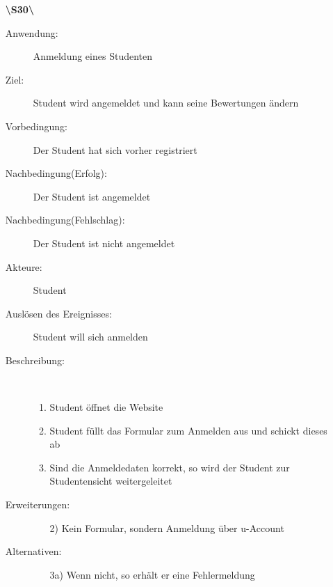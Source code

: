 \documentclass[parskip=full]{scrartcl}
\begin{document}
\begin{enumerate}
  \item[\textbf{\textbackslash S30\textbackslash}] \begin{description}
  \item[Anwendung:] Anmeldung eines Studenten
  \item[Ziel:] Student wird angemeldet und kann seine Bewertungen ändern
  	\item[Vorbedingung:] Der Student hat sich vorher registriert
  	\item[Nachbedingung(Erfolg):] Der Student ist angemeldet
  	\item[Nachbedingung(Fehlschlag):] Der Student ist nicht angemeldet
  	\item[Akteure:] Student
  	\item[Auslösen des Ereignisses:] Student will sich anmelden
  	\item[Beschreibung:]~
  	\begin{enumerate}[1.]
  	  \item Student öffnet die Website
  	  \item Student füllt das Formular zum Anmelden aus und schickt dieses ab
  	  \item Sind die Anmeldedaten korrekt, so wird der Student zur Studentensicht
  	  weitergeleitet
  	\end{enumerate}
  	\item[Erweiterungen:]
  	\begin{enumerate}
  	  \item[2)] Kein Formular, sondern Anmeldung über u-Account
  	\end{enumerate}    	
  	\item[Alternativen:]
	\begin{enumerate}
  	  \item[3a)] Wenn nicht, so erhält er eine Fehlermeldung
  	\end{enumerate}
  \end{description}
  \pagebreak
  

\end{enumerate}
\end{document}
